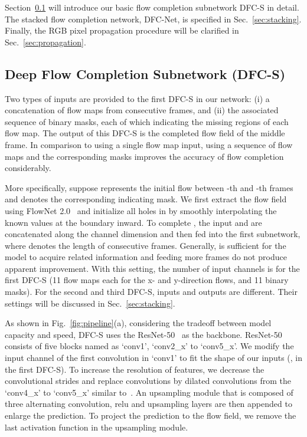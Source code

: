 \documentclass[10pt,twocolumn,letterpaper]{article}
\begin{document}
Section~\ref{sec:dfcs} will introduce our basic flow completion subnetwork DFC-S in detail. The stacked flow completion network, DFC-Net, is specified in Sec.~\ref{sec:stacking}. Finally, the RGB pixel propagation procedure will be clarified in Sec.~\ref{sec:propagation}.


\subsection{Deep Flow Completion Subnetwork (DFC-S)}
\label{sec:dfcs}




Two types of inputs are provided to the first DFC-S in our network: (i) a concatenation of flow maps from consecutive frames, and (ii) the associated sequence of binary masks, each of which indicating the missing regions of each flow map. 
The output of this DFC-S is the completed flow field of the middle frame. 
In comparison to using a single flow map input, using a sequence of flow maps and the corresponding masks improves the accuracy of flow completion considerably. 

More specifically, suppose  represents the initial flow between -th and -th frames and  denotes the corresponding indicating mask.
We first extract the flow field using FlowNet 2.0~\cite{ilg2017flownet} and initialize all holes in  by smoothly interpolating the known values at the boundary inward.
To complete , the input  and  are concatenated along the channel dimension and then fed into the first subnetwork, where  denotes the length of consecutive frames.
Generally,  is sufficient for the model to acquire related information and feeding more frames do not produce apparent improvement.
With this setting, the number of input channels is  for the first DFC-S (11 flow maps each for the x- and y-direction flows, and 11 binary masks).
For the second and third DFC-S, inputs and outputs are different. Their settings will be discussed in Sec.~\ref{sec:stacking}.


As shown in Fig.~\ref{fig:pipeline}(a), considering the tradeoff between model capacity and speed, DFC-S uses the ResNet-50~\cite{he2016deep} as the backbone.
ResNet-50 consists of five blocks named as `conv1', `conv2\_x' to `conv5\_x'.
We modify the input channel of the first convolution in `conv1' to fit the shape of our inputs (\eg,  in the first DFC-S).
To increase the resolution of features, we decrease the convolutional strides and replace convolutions by dilated convolutions from the `conv4\_x' to `conv5\_x' similar to~\cite{chen2014semantic}.
An upsampling module that is composed of three alternating convolution, relu and upsampling layers are then appended to enlarge the prediction.
To project the prediction to the flow field, we remove the last activation function in the upsampling module.
\end{document}
